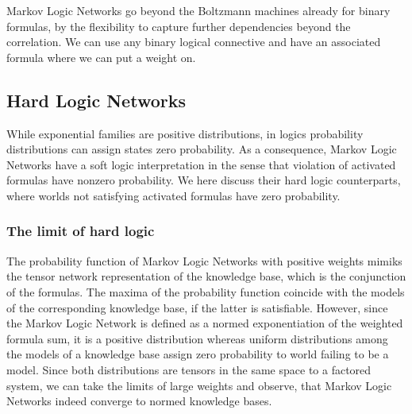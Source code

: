 


Markov Logic Networks go beyond the Boltzmann machines already for binary formulas, by the flexibility to capture further dependencies beyond the correlation.
We can use any binary logical connective and have an associated formula where we can put a weight on.














\subsection{Hard Logic Networks}\label{sec:hardNetworks} %

While exponential families are positive distributions, in logics probability distributions can assign states zero probability.
As a consequence, Markov Logic Networks have a soft logic interpretation in the sense that violation of activated formulas have nonzero probability.
We here discuss their hard logic counterparts, where worlds not satisfying activated formulas have zero probability.

\subsubsection{The limit of hard logic}\label{sec:hardLogicLimit} %

The probability function of Markov Logic Networks with positive weights mimiks the tensor network representation of the knowledge base, which is the conjunction of the formulas. 
The maxima of the probability function coincide with the models of the corresponding knowledge base, if the latter is satisfiable.
However, since the Markov Logic Network is defined as a normed exponentiation of the weighted formula sum, it is a positive distribution whereas uniform distributions among the models of a knowledge base assign zero probability to world failing to be a model.
Since both distributions are tensors in the same space to a factored system, we can take the limits of large weights and observe, that Markov Logic Networks indeed converge to normed knowledge bases.


